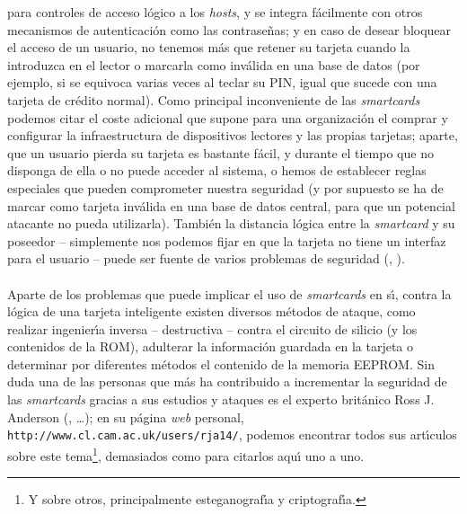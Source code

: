 para controles de acceso l\'ogico a los {\it hosts}, y se integra f\'acilmente 
con otros mecanismos de autenticaci\'on como las contrase\~nas; y en caso de
desear bloquear el acceso de un usuario, no tenemos m\'as que retener su 
tarjeta cuando la introduzca en el lector o marcarla como inv\'alida en una
base de datos (por ejemplo, si se equivoca varias veces al teclar su PIN, igual 
que sucede con una tarjeta de cr\'edito normal). Como principal
inconveniente de las {\it smartcards} podemos citar el coste adicional que
supone para una organizaci\'on el comprar y configurar la infraestructura de
dispositivos lectores y las propias tarjetas; aparte, que un usuario pierda
su tarjeta es bastante f\'acil, y durante el tiempo que no disponga de ella
o no puede acceder al sistema, o hemos de establecer reglas especiales que
pueden comprometer nuestra seguridad (y por supuesto se ha de marcar como 
tarjeta inv\'alida en una base de datos central, para que un potencial atacante
no pueda utilizarla). Tambi\'en la distancia l\'ogica entre la {\it smartcard} y
su poseedor -- simplemente nos podemos fijar en que la tarjeta no tiene
un interfaz para el usuario -- puede ser fuente de varios problemas de
seguridad (\cite{kn:bal99}, \cite{kn:gob96}).\\
\\Aparte de los problemas que puede implicar el uso de {\it smartcards} en 
s\'{\i}, contra la l\'ogica de una tarjeta inteligente existen diversos 
m\'etodos de ataque, como realizar 
ingenier\'{\i}a inversa -- destructiva -- contra el circuito de silicio (y los 
contenidos de la ROM), adulterar la informaci\'on guardada en la tarjeta o 
determinar por diferentes m\'etodos el contenido de la memoria EEPROM. Sin duda
una de las personas que m\'as ha contribuido a incrementar la seguridad de las
{\it smartcards} gracias a sus estudios y ataques es el experto brit\'anico 
Ross J. Anderson (\cite{kn:and97}, \cite{kn:and96}\ldots); en su p\'agina {\it 
web} personal, {\tt http://www.cl.cam.ac.uk/users/rja14/}, podemos encontrar 
todos sus art\'{\i}culos sobre este tema\footnote{Y sobre otros, principalmente 
esteganograf\'{\i}a y criptograf\'{\i}a.}, demasiados como para citarlos 
aqu\'{\i} uno a uno.
